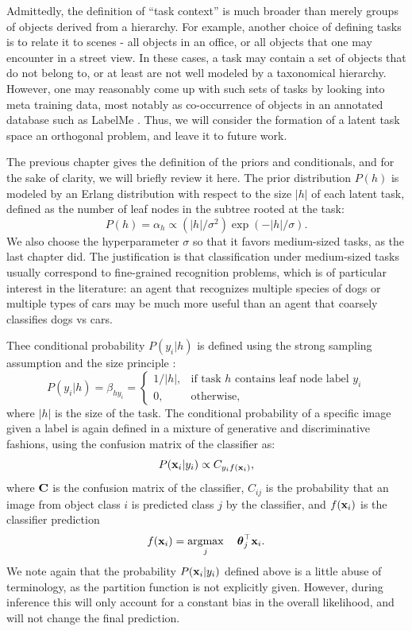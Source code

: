 Admittedly, the definition of ``task context'' is much broader than merely groups of objects derived from a hierarchy. For example, another choice of defining tasks is to relate it to scenes - all objects in an office, or all objects that one may encounter in a street view. In these cases, a task may contain a set of objects that do not belong to, or at least are not well modeled by a taxonomical hierarchy. However, one may reasonably come up with such sets of tasks by looking into meta training data, most notably as co-occurrence of objects in an annotated database such as LabelMe \cite{russell2008labelme}. Thus, we will consider the formation of a latent task space an orthogonal problem, and leave it to future work.

The previous chapter gives the definition of the priors and conditionals, and for the sake of clarity, we will briefly review it here. The prior distribution $P(h)$ is modeled by an Erlang distribution with respect to the size $|h|$ of each latent task, defined as the number of leaf nodes in the subtree rooted at the task:
\begin{equation}
    P(h) = \alpha_h \propto (|h|/\sigma^2) \exp(-|h|/\sigma).
\end{equation}
We also choose the hyperparameter $\sigma$ so that it favors medium-sized tasks, as the last chapter did. The justification is that classification under medium-sized tasks usually correspond to fine-grained recognition problems, which is of particular interest in the literature: an agent that recognizes multiple species of dogs or multiple types of cars may be much more useful than an agent that coarsely classifies dogs vs cars.

Thee conditional probability $P(y_i | h)$ is defined using the strong sampling assumption and the size principle \cite{tenenbaum2001generalization}:
\begin{equation}
    P(y_i | h) = \beta_{hy_i} = \left\{\begin{array}{ll}
            1/|h|, & \text{if task } h \text{ contains leaf node label } y_i\\
                0, & \text{otherwise},
        \end{array}\right.
\end{equation}
where $|h|$ is the size of the task. The conditional probability of a specific image given a label is again defined in a mixture of generative and discriminative fashions, using the confusion matrix of the classifier as:
\begin{equation}
    P(\mathbf{x}_i|y_i) \propto C_{y_if(\mathbf{x}_i)},
\end{equation}
where $\mathbf{C}$ is the confusion matrix of the classifier, $C_{ij}$ is the probability that an image from object class $i$ is predicted class $j$ by the classifier, and $f(\mathbf{x}_i)$ is the classifier prediction
\begin{equation}
    f(\mathbf{x}_i) = \underset{j}{\mathrm{argmax}} \:\quad \boldsymbol{\theta}_j^\top \mathbf{x}_i.
\end{equation}
We note again that the probability $P(\mathbf{x}_i|y_i)$ defined above is a little abuse of terminology, as the partition function is not explicitly given. However, during inference this will only account for a constant bias in the overall likelihood, and will not change the final prediction.

